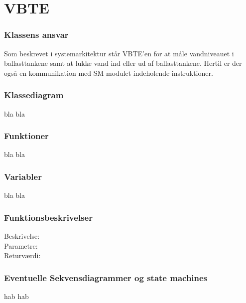 \chapter{VBTE}

\subsection{Klassens ansvar}
Som beskrevet i systemarkitektur står VBTE'en for at måle vandniveauet i ballasttankene samt at lukke vand ind eller ud af ballasttankene. Hertil er der også en kommunikation med SM modulet indeholende instruktioner.
\subsection{Klassediagram}
bla bla
\subsection{Funktioner}
bla bla
\subsection{Variabler}
bla bla
\subsection{Funktionsbeskrivelser}
Beskrivelse:\\
Parametre:\\
Returværdi:\\
\subsection{Eventuelle Sekvensdiagrammer og state machines}
hab hab